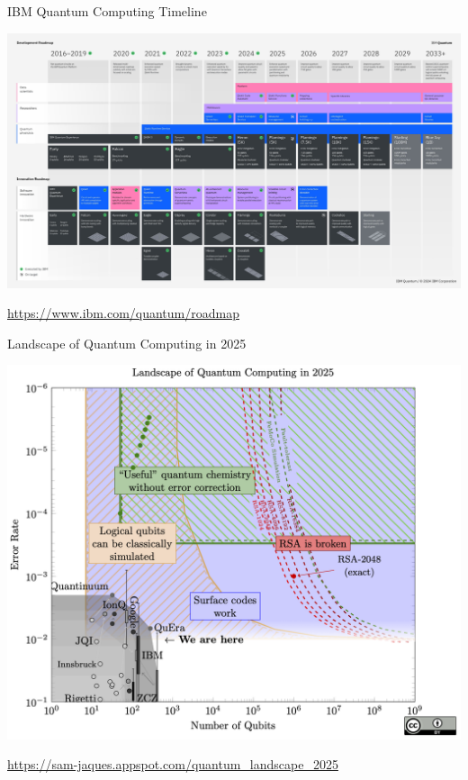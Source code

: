 \documentclass[xcolor=table,10pt,aspectratio=169]{beamer}
\begin{document}
\begin{frame}[label={sec:org2132fc0}]{IBM Quantum Computing Timeline}
\begin{center}
\includegraphics[keepaspectratio,height=.8\textheight]{./lecture-assumptions-IBM_Quantum_Developmen_&_Innovation_Roadmap_Explainer_2024-Update-03.jpg}
\end{center}

{\tiny \url{https://www.ibm.com/quantum/roadmap} \par}
\end{frame}
\begin{frame}[label={sec:org4c361b4}]{Landscape of Quantum Computing in 2025}
\begin{center}
\includegraphics[keepaspectratio,height=.8\textheight]{./lecture-assumptions-quantum-landscape.png}
\end{center}

{\tiny \url{https://sam-jaques.appspot.com/quantum\_landscape\_2025} \par}
\end{frame}
\end{document}
